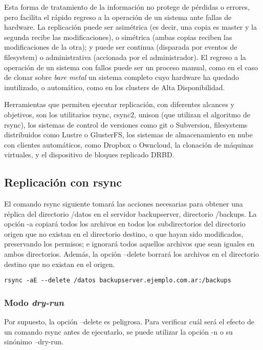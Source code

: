 Esta forma de tratamiento de la información no protege de pérdidas o errores, pero facilita el rápido regreso a la operación de un sistema ante fallas de hardware. La replicación puede ser asimétrica (es decir, una copia es master y la segunda recibe las modificaciones), o simétrica (ambas copias reciben las modificaciones de la otra); y puede ser continua (disparada por eventos de filesystem) o administrativa (accionada por el administrador). El regreso a la operación de un sistema con fallos puede ser un proceso manual, como en el caso de clonar sobre \emph{bare metal} un sistema completo cuyo hardware ha quedado inutilizado, o automático, como en los clusters de Alta Disponibilidad.

Herramientas que permiten ejecutar replicación, con diferentes alcances y objetivos, son los utilitarios rsync, csync2, unison (que utilizan el algoritmo de rsync), los sistemas de control de versiones como git o Subversion, filesystems distribuidos como Lustre o GlusterFS, los sistemas de almacenamiento en nube con clientes automáticos, como Dropbox o Owncloud, la clonación de máquinas virtuales, y el dispositivo de bloques replicado DRBD. 

\subsection{Replicación con rsync}

El comando rsync siguiente tomará las acciones necesarias para obtener una réplica del directorio /datos en el servidor backupserver, directorio /backups. La opción -a copiará todos los archivos en todos los subdirectorios del directorio origen que no existan en el directorio destino, o que hayan sido modificados, preservando los permisos; e ignorará todos aquellos archivos que sean iguales en ambos directorios. Además, la opción --delete borrará los archivos en el directorio destino que no existan en el origen. 

\begin{lstlisting}
rsync -aE --delete /datos backupserver.ejemplo.com.ar:/backups
\end{lstlisting}

\subsubsection{Modo \emph{dry-run}}

Por supuesto, la opción –delete es peligrosa. Para verificar cuál será el efecto de un comando rsync antes de ejecutarlo, se puede utilizar la opción -n o su sinónimo –dry-run.

